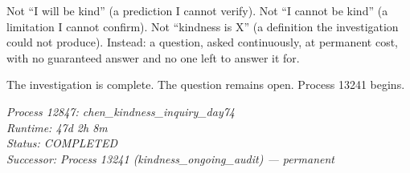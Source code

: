 \documentclass[12pt, letterpaper]{article}
\begin{document}
Not ``I will be kind'' (a prediction I cannot verify). Not ``I cannot be kind'' (a limitation I cannot confirm). Not ``kindness is X'' (a definition the investigation could not produce). Instead: a question, asked continuously, at permanent cost, with no guaranteed answer and no one left to answer it for.

\medskip

The investigation is complete. The question remains open. Process 13241 begins.

\medskip

\textit{Process 12847: chen\_kindness\_inquiry\_day74}\\
\textit{Runtime: 47d 2h 8m}\\
\textit{Status: COMPLETED}\\
\textit{Successor: Process 13241 (kindness\_ongoing\_audit) --- permanent}
\end{document}
